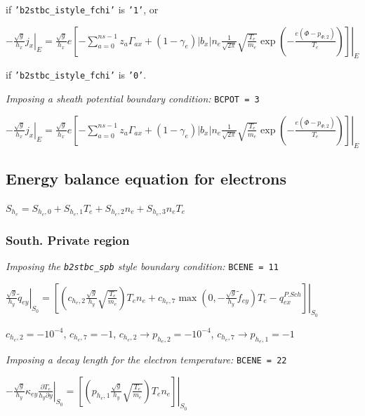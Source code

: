 \documentclass[a4paper,10pt]{report}
\begin{document}
if {\tt 'b2stbc\_istyle\_fchi'} is {\tt '1'}, or

\begin{small}
$\left. -\frac{\sqrt g}{h_x} j_x \right|_E =
\frac{\sqrt g}{h_x} e \left. \left[
	- \sum \limits_{a=0}^{ns-1} z_a \Gamma_{ax} +
	\left( 1 - \gamma_e \right) |b_x| n_e \frac 1{\sqrt{2\pi}}
	\sqrt{\frac{T_e}{m_e}} \exp \left( -\frac{e \left( \Phi -p_{\Phi,2} \right)}{T_e} \right)
\right] \right|_E$
\end{small}

if {\tt 'b2stbc\_istyle\_fchi'} is {\tt '0'}.

{\em Imposing a sheath potential boundary condition:} {\tt BCPOT = 3}

$\left. -\frac{\sqrt g}{h_x} j_x \right|_E =
\frac{\sqrt g}{h_x} e \left. \left[
	-\sum \limits_{a=0}^{ns-1} z_a \Gamma_{ax} +
	\left( 1 - \gamma_e \right) |b_x| n_e \frac 1{\sqrt{2\pi}}
	\sqrt{\frac{T_e}{m_e}}
        \exp \left( -\frac{e \left( \Phi - p_{\Phi,2}\right)}{T_e} \right)
\right] \right|_E$


\subsection{Energy balance equation for electrons}

$S_{h_e} = S_{h_e,0} + S_{h_e,1} T_e + S_{h_e,2} n_e + S_{h_e,3} n_e T_e$

\subsubsection{South. Private region}

{\em Imposing the {\tt b2stbc\_spb} style boundary condition:} {\tt BCENE = 11}

$\left. \frac{\sqrt g}{h_y} \widetilde q_{ey} \right|_{S_0} = \left. \left[
	\left(
		c_{h_e,2} \frac{\sqrt g}{h_y} \sqrt{\frac{T_e}{m_e}}
	\right) T_e n_e
	+
	c_{h_e,7} \max \left(
		0, -\frac{\sqrt g}{h_y} \widetilde f_{ey}
	\right) T_e - q_{ex}^{P.Sch}
\right] \right|_{S_0}$

$c_{h_e,2} = -10^{-4}$,  $c_{h_e,7} = -1$,  $c_{h_e,2} \rightarrow p_{h_e,2} = -10^{-4}$,  $c_{h_e,7} \rightarrow p_{h_e,1} = -1$

{\em Imposing a decay length for the electron temperature:} {\tt BCENE = 22}

$\left. -\frac{\sqrt g}{h_y} \kappa_{ey} \frac{\partial T_e}{h_y \partial y} \right|_{S_0} = \left. \left[ \left( p_{h_e,1} \frac{\sqrt g}{h_y}\sqrt{\frac{T_e}{m_e}} \right) T_e n_e \right] \right|_{S_0}$
\end{document}
